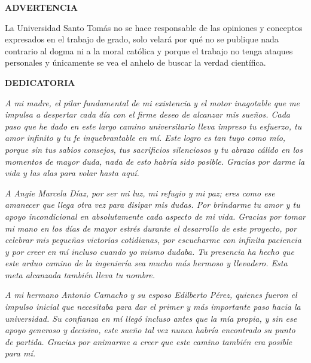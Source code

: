 \newpage
\thispagestyle{empty}

\begin{center}
    {\fontsize{14}{17}\selectfont \textbf{ADVERTENCIA}}
\end{center}

\vspace{1cm}

\noindent
La Universidad Santo Tomás no se hace responsable de las opiniones y conceptos expresados en el trabajo de grado, solo velará por qué no se publique nada contrario al dogma ni a la moral católica y porque el trabajo no tenga ataques personales y únicamente se vea el anhelo de buscar la verdad científica.

\newpage
\begin{center}
	{\large\bfseries DEDICATORIA}
\end{center}

\vspace{2cm}

\begin{flushright}
	\textit{
		A mi madre, el pilar fundamental de mi existencia y el motor inagotable que me impulsa a despertar cada día con el firme deseo de alcanzar mis sueños. Cada paso que he dado en este largo camino universitario lleva impreso tu esfuerzo, tu amor infinito y tu fe inquebrantable en mí. Este logro es tan tuyo como mío, porque sin tus sabios consejos, tus sacrificios silenciosos y tu abrazo cálido en los momentos de mayor duda, nada de esto habría sido posible. Gracias por darme la vida y las alas para volar hasta aquí.
	}
	
	\vspace{1cm}
	
	\textit{
		A Angie Marcela Díaz, por ser mi luz, mi refugio y mi paz; eres como ese amanecer que llega otra vez para disipar mis dudas. Por brindarme tu amor y tu apoyo incondicional en absolutamente cada aspecto de mi vida. Gracias por tomar mi mano en los días de mayor estrés durante el desarrollo de este proyecto, por celebrar mis pequeñas victorias cotidianas, por escucharme con infinita paciencia y por creer en mí incluso cuando yo mismo dudaba. Tu presencia ha hecho que este arduo camino de la ingeniería sea mucho más hermoso y llevadero. Esta meta alcanzada también lleva tu nombre.
	}
	
	\vspace{1cm}
	
	\textit{
		A mi hermano Antonio Camacho y su esposo Edilberto Pérez, quienes fueron el impulso inicial que necesitaba para dar el primer y más importante paso hacia la universidad. Su confianza en mí llegó incluso antes que la mía propia, y sin ese apoyo generoso y decisivo, este sueño tal vez nunca habría encontrado su punto de partida. Gracias por animarme a creer que este camino también era posible para mí.
	}
\end{flushright}


